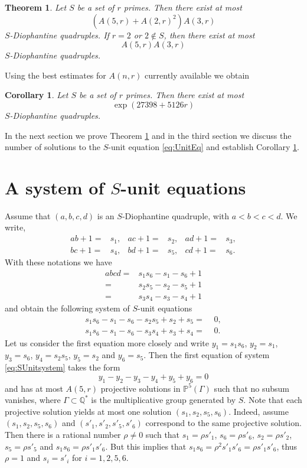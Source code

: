 \documentclass{amsart}
\newtheorem{theorem}{Theorem}
\newtheorem{corollary}{Corollary}
\theoremstyle{remark}
\begin{document}
\begin{theorem}\label{Th:quadruples}
Let $S$ be a set of $r$ primes. Then there exist at most 
$$(A(5,r)+A(2,r)^2)A(3,r)$$
$S$-Diophantine quadruples. If $r=2$ or $2\not \in S$, then there exist at most $$A(5,r)A(3,r)$$
$S$-Diophantine quadruples. 
\end{theorem}

Using the best estimates for $A(n,r)$ currently available we obtain

\begin{corollary}\label{Cor:quadruples}
Let $S$ be a set of $r$ primes. Then there exist at most
$$\exp(27398+5126r)$$
$S$-Diophantine quadruples. 
\end{corollary}

In the next section we prove Theorem \ref{Th:quadruples} and in the third section we discuss the number of solutions to  the $S$-unit equation 
\eqref{eq:UnitEq} 
and establish Corollary \ref{Cor:quadruples}.

\section{A system of $S$-unit equations}

Assume that $(a,b,c,d)$ is an $S$-Diophantine quadruple, with $a<b<c<d$. We write,
\begin{align*}
ab+1=&s_1,&ac+1=&s_2, &ad+1=&s_3, \\
bc+1=&s_4,&bd+1=&s_5, &cd+1=&s_6.
\end{align*}
With these notations we have
\begin{align*}
abcd=& s_1s_6-s_1-s_6+1 \\
= & s_2s_5-s_2-s_5+1 \\
= & s_3s_4-s_3-s_4+1
\end{align*}
and obtain the following system of $S$-unit equations
\begin{equation}\label{eq:SUnitsystem}
\begin{split}
s_1s_6-s_1-s_6-s_2s_5+s_2+s_5=&\,\,0,\\
s_1s_6-s_1-s_6-s_3s_4+s_3+s_4=&\,\,0.
\end{split}
\end{equation}
Let us consider the first equation more closely and write $y_1=s_1s_6$, $y_2=s_1$, $y_3=s_6$, $y_4=s_2s_5$, $y_5=s_2$ and $y_6=s_5$. Then the 
first equation of system \eqref{eq:SUnitsystem} takes the form
\[y_1-y_2-y_3-y_4+y_5+y_6=0\]
and has at most $A(5,r)$ projective solutions in ${\mathbb {P}}^5(\Gamma)$ such that no subsum vanishes, where $\Gamma\subset {\mathbb{Q}}^*$ is the multiplicative group generated 
by $S$. Note that each projective solution yields at most one solution $(s_1,s_2,s_5,s_6)$.
Indeed, assume $(s_1,s_2,s_5,s_6)$ and $(s'_1,s'_2,s'_5,s'_6)$ correspond to the same projective solution. Then there is a rational number $\rho\neq 0$ such 
that
$s_1=\rho s'_1$, $s_6=\rho s'_6$, $s_2=\rho s'_2$, $s_5=\rho s'_5$ and $s_1s_6=\rho s'_1s'_6$. But this implies that $s_1s_6=\rho^2 s'_1s'_6=\rho s'_1s'_6$, 
thus 
$\rho=1$ and $s_i=s'_i$ for $i=1,2,5,6$.
\end{document}
